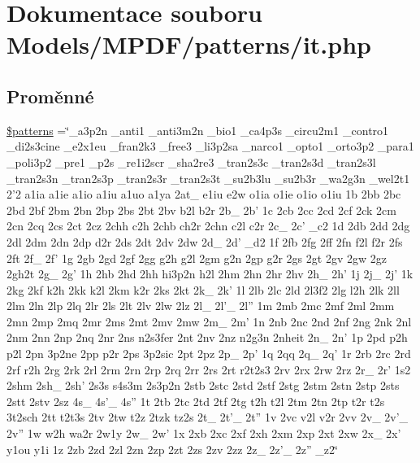 \hypertarget{it_8php}{\section{Dokumentace souboru Models/\-M\-P\-D\-F/patterns/it.php}
\label{it_8php}
}
\subsection*{Proměnné}
\begin{DoxyCompactItemize}
\item 
\hyperlink{it_8php_a99c668c59ad650ca9b31ad5313dc5720}{\$patterns} =\char`\"{}\-\_\-a3p2n \-\_\-anti1 \-\_\-anti3m2n \-\_\-bio1 \-\_\-ca4p3s \-\_\-circu2m1 \-\_\-contro1 \-\_\-di2s3cine \-\_\-e2x1eu \-\_\-fran2k3 \-\_\-free3 \-\_\-li3p2sa \-\_\-narco1 \-\_\-opto1 \-\_\-orto3p2 \-\_\-para1 \-\_\-poli3p2 \-\_\-pre1 \-\_\-p2s \-\_\-re1i2scr \-\_\-sha2re3 \-\_\-tran2s3c \-\_\-tran2s3d \-\_\-tran2s3l \-\_\-tran2s3n \-\_\-tran2s3p \-\_\-tran2s3r \-\_\-tran2s3t \-\_\-su2b3lu \-\_\-su2b3r \-\_\-wa2g3n \-\_\-wel2t1 2'2 a1ia a1ie a1io a1iu a1uo a1ya 2at\-\_\- e1iu e2w o1ia o1ie o1io o1iu 1b 2bb 2bc 2bd 2bf 2bm 2bn 2bp 2bs 2bt 2bv b2l b2r 2b\-\_\- 2b' 1c 2cb 2cc 2cd 2cf 2ck 2cm 2cn 2cq 2cs 2ct 2cz 2chh c2h 2chb ch2r 2chn c2l c2r 2c\-\_\- 2c' \-\_\-c2 1d 2db 2dd 2dg 2dl 2dm 2dn 2dp d2r 2ds 2dt 2dv 2dw 2d\-\_\- 2d' \-\_\-d2 1f 2fb 2fg 2ff 2fn f2l f2r 2fs 2ft 2f\-\_\- 2f' 1g 2gb 2gd 2gf 2gg g2h g2l 2gm g2n 2gp g2r 2gs 2gt 2gv 2gw 2gz 2gh2t 2g\-\_\- 2g' 1h 2hb 2hd 2hh hi3p2n h2l 2hm 2hn 2hr 2hv 2h\-\_\- 2h' 1j 2j\-\_\- 2j' 1k 2kg 2kf k2h 2kk k2l 2km k2r 2ks 2kt 2k\-\_\- 2k' 1l 2lb 2lc 2ld 2l3f2 2lg l2h 2lk 2ll 2lm 2ln 2lp 2lq 2lr 2ls 2lt 2lv 2lw 2lz 2l\-\_\- 2l'\-\_\- 2l'' 1m 2mb 2mc 2mf 2ml 2mm 2mn 2mp 2mq 2mr 2ms 2mt 2mv 2mw 2m\-\_\- 2m' 1n 2nb 2nc 2nd 2nf 2ng 2nk 2nl 2nm 2nn 2np 2nq 2nr 2ns n2s3fer 2nt 2nv 2nz n2g3n 2nheit 2n\-\_\- 2n' 1p 2pd p2h p2l 2pn 3p2ne 2pp p2r 2ps 3p2sic 2pt 2pz 2p\-\_\- 2p' 1q 2qq 2q\-\_\- 2q' 1r 2rb 2rc 2rd 2rf r2h 2rg 2rk 2rl 2rm 2rn 2rp 2rq 2rr 2rs 2rt r2t2s3 2rv 2rx 2rw 2rz 2r\-\_\- 2r' 1s2 2shm 2sh\-\_\- 2sh' 2s3s s4s3m 2s3p2n 2stb 2stc 2std 2stf 2stg 2stm 2stn 2stp 2sts 2stt 2stv 2sz 4s\-\_\- 4s'\-\_\- 4s'' 1t 2tb 2tc 2td 2tf 2tg t2h t2l 2tm 2tn 2tp t2r t2s 3t2sch 2tt t2t3s 2tv 2tw t2z 2tzk tz2s 2t\-\_\- 2t'\-\_\- 2t'' 1v 2vc v2l v2r 2vv 2v\-\_\- 2v'\-\_\- 2v'' 1w w2h wa2r 2w1y 2w\-\_\- 2w' 1x 2xb 2xc 2xf 2xh 2xm 2xp 2xt 2xw 2x\-\_\- 2x' y1ou y1i 1z 2zb 2zd 2zl 2zn 2zp 2zt 2zs 2zv 2zz 2z\-\_\- 2z'\-\_\- 2z'' \-\_\-z2\char`\"{}
\end{DoxyCompactItemize}


